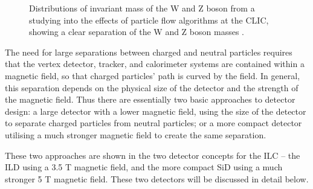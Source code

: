 \begin{figure}[!b]%
	\centering
    \qquad
    \caption{Distributions of invariant mass of the W and Z boson from a studying into the effects of particle flow algorithms at the \acrlong{CLIC}, showing a clear separation of the W and Z boson masses \cite{particle-flow-clic}.}%
    \label{figure:colliders/particle-flow}%
\end{figure}

The need for large separations between charged and neutral particles requires that the vertex detector, tracker, and calorimeter systems are contained within a magnetic field, so that charged particles' path is curved by the field. In general, this separation depends on the physical size of the detector and the strength of the magnetic field. Thus there are essentially two basic approaches to detector design: a large detector with a lower magnetic field, using the size of the detector to separate charged particles from neutral particles; or a more compact detector utilising a much stronger magnetic field to create the same separation.

These two approaches are shown in the two detector concepts for the \acrshort{ILC} -- the \acrlong{ILD} using a 3.5 T magnetic field, and the more compact \acrlong{SiD} using a much stronger 5 T magnetic field. These two detectors will be discussed in detail below.

